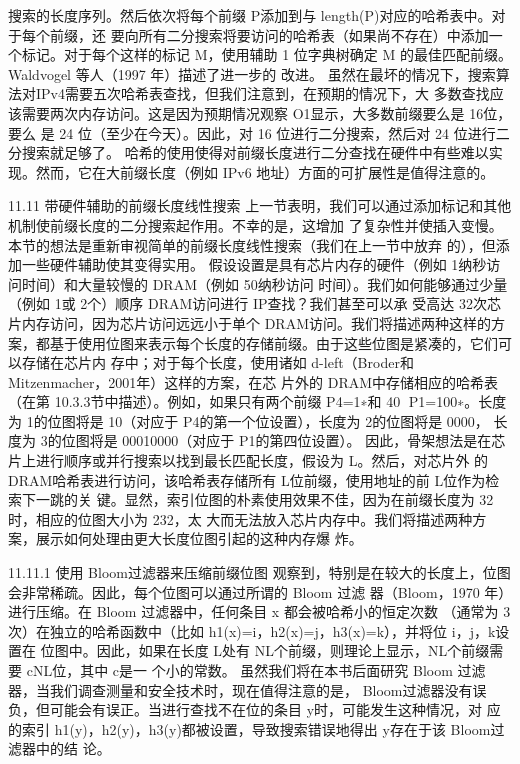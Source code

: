搜索的长度序列。然后依次将每个前缀 P添加到与 length(P)对应的哈希表中。对于每个前缀，还
要向所有二分搜索将要访问的哈希表（如果尚不存在）中添加一个标记。对于每个这样的标记
M，使用辅助 1 位字典树确定 M 的最佳匹配前缀。Waldvogel 等人（1997 年）描述了进一步的
改进。
虽然在最坏的情况下，搜索算法对IPv4需要五次哈希表查找，但我们注意到，在预期的情况下，大
多数查找应该需要两次内存访问。这是因为预期情况观察 O1显示，大多数前缀要么是 16位，要么
是 24 位（至少在今天）。因此，对 16 位进行二分搜索，然后对 24 位进行二分搜索就足够了。
哈希的使用使得对前缀长度进行二分查找在硬件中有些难以实现。然而，它在大前缀长度（例如
IPv6 地址）方面的可扩展性是值得注意的。



11.11 带硬件辅助的前缀长度线性搜索
上一节表明，我们可以通过添加标记和其他机制使前缀长度的二分搜索起作用。不幸的是，这增加
了复杂性并使插入变慢。本节的想法是重新审视简单的前缀长度线性搜索（我们在上一节中放弃
的），但添加一些硬件辅助使其变得实用。
假设设置是具有芯片内存的硬件（例如 1纳秒访问时间）和大量较慢的 DRAM（例如 50纳秒访问
时间）。我们如何能够通过少量（例如 1或 2个）顺序 DRAM访问进行 IP查找？我们甚至可以承
受高达 32次芯片内存访问，因为芯片访问远远小于单个 DRAM访问。我们将描述两种这样的方
案，都基于使用位图来表示每个长度的存储前缀。由于这些位图是紧凑的，它们可以存储在芯片内
存中；对于每个长度，使用诸如 d-left（Broder和 Mitzenmacher，2001年）这样的方案，在芯
片外的 DRAM中存储相应的哈希表（在第 10.3.3节中描述）。例如，如果只有两个前缀 P4=1∗和
                                                       40
P1=100∗。长度为 1的位图将是 10（对应于 P4的第一个位设置），长度为 2的位图将是 0000，
长度为 3的位图将是 00010000（对应于 P1的第四位设置）。
因此，骨架想法是在芯片上进行顺序或并行搜索以找到最长匹配长度，假设为 L。然后，对芯片外
的 DRAM哈希表进行访问，该哈希表存储所有 L位前缀，使用地址的前 L位作为检索下一跳的关
键。显然，索引位图的朴素使用效果不佳，因为在前缀长度为 32时，相应的位图大小为 232，太
大而无法放入芯片内存中。我们将描述两种方案，展示如何处理由更大长度位图引起的这种内存爆
炸。

11.11.1 使用 Bloom过滤器来压缩前缀位图
观察到，特别是在较大的长度上，位图会非常稀疏。因此，每个位图可以通过所谓的 Bloom 过滤
器（Bloom，1970 年）进行压缩。在 Bloom 过滤器中，任何条目 x 都会被哈希小的恒定次数
（通常为 3次）在独立的哈希函数中（比如 h1(x)=i，h2(x)=j，h3(x)=k），并将位 i，j，k设置在
位图中。因此，如果在长度 L处有 NL个前缀，则理论上显示，NL个前缀需要 cNL位，其中 c是一
个小的常数。
虽然我们将在本书后面研究 Bloom 过滤器，当我们调查测量和安全技术时，现在值得注意的是，
Bloom过滤器没有误负，但可能会有误正。当进行查找不在位的条目 y时，可能发生这种情况，对
应的索引 h1(y)，h2(y)，h3(y)都被设置，导致搜索错误地得出 y存在于该 Bloom过滤器中的结
论。



